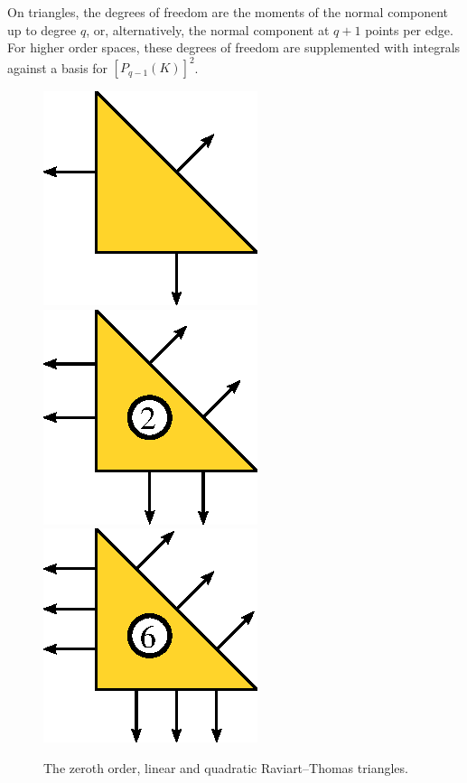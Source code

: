 On triangles, the degrees of freedom are the moments of the normal
component up to degree \( q \), or, alternatively, the normal
component at \( q + 1 \) points per edge. For higher order spaces,
these degrees of freedom are supplemented with integrals against a
basis for \( [P_{q-1}(K)]^2 \).

\begin{figure}[H]
  \begin{center}
    \includegraphics[width=\elementwidth]{chapters/kirby-6/eps/RT0.eps}
    \includegraphics[width=\elementwidth]{chapters/kirby-6/eps/RT1.eps}
    \includegraphics[width=\elementwidth]{chapters/kirby-6/eps/RT2.eps}
    \caption{The zeroth order, linear and quadratic Raviart--Thomas
      triangles.}
  \end{center}
\end{figure}

